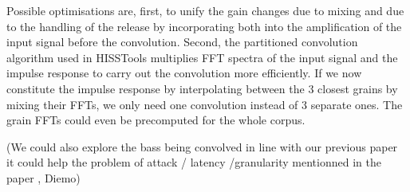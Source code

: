 Possible optimisations are, first, to unify the gain changes due to mixing and due to the handling of the release by incorporating both into the amplification of the input signal before the convolution.
Second, the partitioned convolution algorithm used in HISSTools multiplies FFT spectra of the input signal and the impulse response to carry out the convolution more efficiently.  If we now constitute the impulse response by interpolating between the 3 closest grains by mixing their FFTs, we only need one convolution instead of 3 separate ones.  The grain FFTs could even be precomputed for the whole corpus. %

(We could also explore the bass being convolved in line with our previous paper it could help the problem of attack / latency /granularity mentionned in the paper \cite{TremblaySchwarz-nime2010-surfing-the-waves}, Diemo)

